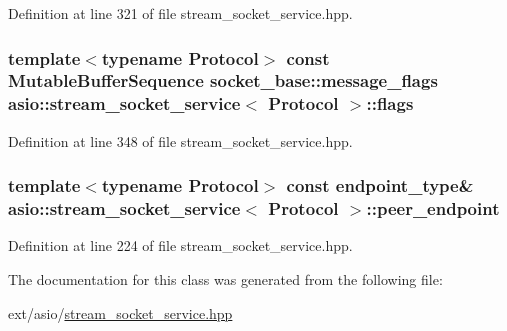 Definition at line 321 of file stream\+\_\+socket\+\_\+service.\+hpp.

\hypertarget{classasio_1_1stream__socket__service_a0531bf38d8ac2bda7cd35e92827b2e8c}{}
\subsubsection[{flags}]{\setlength{\rightskip}{0pt plus 5cm}template$<$typename Protocol$>$ const Mutable\+Buffer\+Sequence {\bf socket\+\_\+base\+::message\+\_\+flags} {\bf asio\+::stream\+\_\+socket\+\_\+service}$<$ Protocol $>$\+::flags}\label{classasio_1_1stream__socket__service_a0531bf38d8ac2bda7cd35e92827b2e8c}


Definition at line 348 of file stream\+\_\+socket\+\_\+service.\+hpp.

\hypertarget{classasio_1_1stream__socket__service_a10482eb90896463e21694b8fc352ff96}{}
\subsubsection[{peer\+\_\+endpoint}]{\setlength{\rightskip}{0pt plus 5cm}template$<$typename Protocol$>$ const {\bf endpoint\+\_\+type}\& {\bf asio\+::stream\+\_\+socket\+\_\+service}$<$ Protocol $>$\+::peer\+\_\+endpoint}\label{classasio_1_1stream__socket__service_a10482eb90896463e21694b8fc352ff96}


Definition at line 224 of file stream\+\_\+socket\+\_\+service.\+hpp.



The documentation for this class was generated from the following file\+:\begin{DoxyCompactItemize}
\item 
ext/asio/\hyperlink{stream__socket__service_8hpp}{stream\+\_\+socket\+\_\+service.\+hpp}\end{DoxyCompactItemize}
